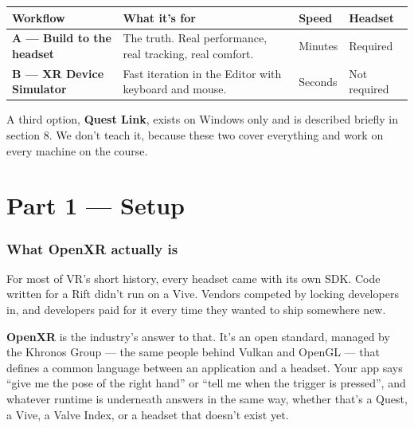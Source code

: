 \documentclass[11pt,a4paper]{article}
\begin{document}
\begin{longtable}[]{@{}
  >{\raggedright\arraybackslash}p{}
  >{\raggedright\arraybackslash}p{}
  >{\raggedright\arraybackslash}p{}
  >{\raggedright\arraybackslash}p{}@{}}
\toprule\noalign{}
\begin{minipage}[b]{\linewidth}\raggedright
Workflow
\end{minipage} & \begin{minipage}[b]{\linewidth}\raggedright
What it's for
\end{minipage} & \begin{minipage}[b]{\linewidth}\raggedright
Speed
\end{minipage} & \begin{minipage}[b]{\linewidth}\raggedright
Headset
\end{minipage} \\
\midrule\noalign{}
\endhead
\bottomrule\noalign{}
\endlastfoot
\textbf{A --- Build to the headset} & The truth. Real performance, real tracking, real comfort. & Minutes & Required \\
\textbf{B --- XR Device Simulator} & Fast iteration in the Editor with keyboard and mouse. & Seconds & Not required \\
\end{longtable}

A third option, \textbf{Quest Link}, exists on Windows only and is described briefly in
section 8. We don't teach it, because these two cover everything and work on every
machine on the course.


\clearpage
\part*{Part 1 --- Setup}

\section{What OpenXR actually is}\label{what-openxr-actually-is}

For most of VR's short history, every headset came with its own SDK. Code written for a
Rift didn't run on a Vive. Vendors competed by locking developers in, and developers paid
for it every time they wanted to ship somewhere new.

\textbf{OpenXR} is the industry's answer to that. It's an open standard, managed by the Khronos
Group --- the same people behind Vulkan and OpenGL --- that defines a common language between
an application and a headset. Your app says ``give me the pose of the right hand'' or ``tell
me when the trigger is pressed'', and whatever runtime is underneath answers in the same
way, whether that's a Quest, a Vive, a Valve Index, or a headset that doesn't exist yet.
\end{document}
